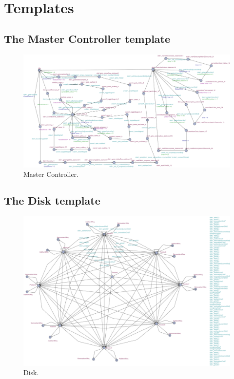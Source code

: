 \onecolumn
\section{Templates}\label{appendix:templates}

\subsection{The Master Controller template}
\begin{figure}[H]
    \centering
    \includegraphics[width=\textwidth]{Image/uppaal-templates/MasterController.png}
    \caption{Master Controller.}
    \label{fig:master_controller}
\end{figure}

\newpage
\subsection{The Disk template}
\begin{figure}[H]
    \centering
    \includegraphics[width=\textwidth]{Image/uppaal-templates/disk1.png}
    \caption{Disk.}
    \label{fig:disk}
\end{figure}

